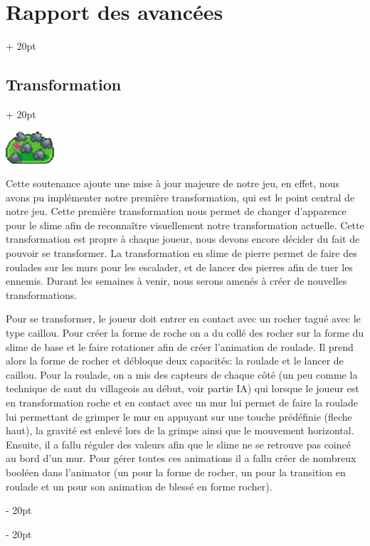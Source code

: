 \documentclass[a4paper, 12pt, twoside]{article}
\newcommand{\ind}[1][20pt]{\advance\leftskip + #1}
\newcommand{\deind}[1][20pt]{\advance\leftskip - #1}
\newenvironment{indt}[2][20pt]{#2 \par \ind[#1]}{\par \deind} %
\begin{document}
\begin{indt}{\section{Rapport des avancées}}
        \begin{indt}{\subsection{Transformation}}
            \begin{center}
                \includegraphics[width=0.5\linewidth]{slime_rock.png}
            \end{center}

            Cette soutenance ajoute une mise à jour majeure de notre jeu, en effet, nous avons pu implémenter notre première transformation, qui est le point central de notre jeu. Cette première transformation nous permet de changer d'apparence pour le slime afin de reconnaître visuellement notre transformation actuelle. Cette transformation est propre à chaque joueur, nous devons encore décider du fait de pouvoir se transformer. La transformation en slime de pierre permet de faire des roulades sur les murs pour les escalader, et de lancer des pierres afin de tuer les ennemis. Durant les semaines à venir, nous serons amenés à créer de nouvelles transformations.

            Pour se transformer, le joueur doit entrer en contact avec un rocher tagué avec le type caillou. Pour créer la forme de roche on a du collé des rocher sur la forme du slime de base et le faire rotationer afin de créer l'animation de roulade. Il prend alors la forme de rocher et débloque deux capacités: la roulade et le lancer de caillou. Pour la roulade, on a mis des capteurs de chaque côté (un peu comme la technique de saut du villageois au début, voir partie IA) qui lorsque le joueur est en transformation roche et en contact avec un mur lui permet de faire la roulade lui permettant de grimper le mur en appuyant sur une touche prédéfinie (fleche haut), la gravité est enlevé lors de la grimpe ainsi que le mouvement horizontal. Ensuite, il a fallu réguler des valeurs afin que le slime ne se retrouve pas coincé au bord d'un mur. Pour gérer toutes ces animations il a fallu créer de nombreux booléen dans l'animator (un pour la forme de rocher, un pour la transition en roulade et un pour son animation de blessé en forme rocher).


\end{indt}
\end{indt}
\end{document}
